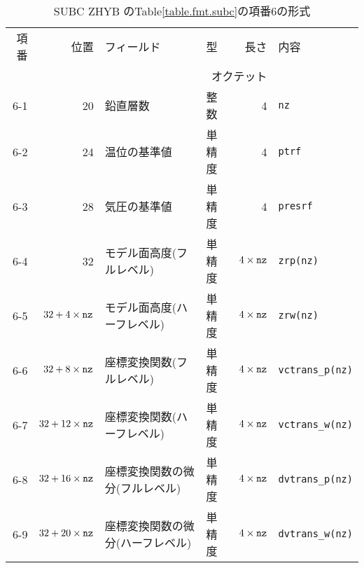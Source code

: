 \begin{table}[htp]
 \begin{center}
  \begin{tabular}{rr|llrl}
 \hline
 項番 & 位置 & フィールド & 型 & 長さ & 内容 \\
      &      &            & \multicolumn{2}{r}{オクテット} &  \\
 \hline
   6-1 & 20 & 鉛直層数 & 整数   &     4  & {\tt nz} \\
   6-2 & 24 & 温位の基準値 & 単精度 & 4  & {\tt ptrf} \\
   6-3 & 28 & 気圧の基準値 & 単精度 & 4  & {\tt presrf} \\
   6-4 & 32 & モデル面高度(フルレベル) & 単精度 & $4\times {\tt nz}$ &
   {\tt zrp(nz)}\\
   6-5 & $32 + 4\times{\tt nz}$ & 
    モデル面高度(ハーフレベル) & 単精度 & $4\times {\tt nz}$ & {\tt zrw(nz)}\\
   6-6 & $32 + 8\times{\tt nz}$ & 
    座標変換関数(フルレベル) & 単精度 & $4\times {\tt nz}$ & {\tt vctrans\_p(nz)}\\
   6-7 & $32 + 12\times{\tt nz}$ & 
    座標変換関数(ハーフレベル) & 単精度 & $4\times {\tt nz}$ & {\tt vctrans\_w(nz)}\\
   6-8 & $32 + 16\times{\tt nz}$ & 
    座標変換関数の微分(フルレベル) & 単精度 & $4\times {\tt nz}$ & {\tt dvtrans\_p(nz)}\\
   6-9 & $32 + 20\times{\tt nz}$ & 
    座標変換関数の微分(ハーフレベル) & 単精度 & $4\times {\tt nz}$ &
   {\tt dvtrans\_w(nz)}\\ \hline
  \end{tabular}
 \end{center}
 \caption{SUBC ZHYB のTable\ref{table.fmt.subc}の項番6の形式}
 \label{table.fmt.subc.zhyb}
\end{table}

